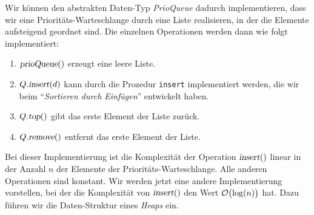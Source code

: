 Wir k\"onnen den abstrakten Daten-Typ \textsl{PrioQueue} dadurch implementieren,
dass wir eine Priorit\"ats-Warteschlange durch eine Liste realisieren, in der die Elemente
aufsteigend geordnet sind. Die einzelnen Operationen werden dann wie folgt implementiert:
\begin{enumerate}
\item $\textsl{prioQueue}()$ erzeugt eine leere Liste.
\item $Q.\textsl{insert}(d)$ kann durch die Prozedur \texttt{insert} implementiert werden,
      die wir beim ``\emph{Sortieren durch Einf\"ugen}'' entwickelt haben.
\item $Q.\textsl{top}()$ gibt das erste Element der Liste zur\"uck.
\item $Q.\textsl{remove}()$ entfernt das erste Element der Liste.
\end{enumerate}
Bei dieser Implementierung ist die Komplexit\"at der Operation $\textsl{insert}()$ 
linear in der
Anzahl $n$ der Elemente der Priorit\"ats-Warteschlange.  Alle anderen Operationen sind
konstant. Wir werden jetzt eine andere
Implementierung vorstellen, bei der die Komplexit\"at von $\textsl{insert}()$ 
 den Wert $\mathcal{O}\bigl(\log(n)\bigr)$ hat.  Dazu f\"uhren wir die Daten-Struktur eines
 \emph{Heaps} ein.

